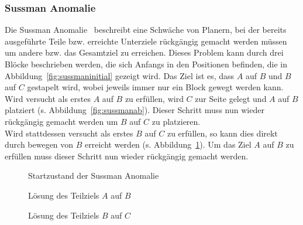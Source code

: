 \subsubsection{Sussman Anomalie}
Die Sussman Anomalie~\cite{sussman} beschreibt eine Schwäche von Planern, bei der bereits ausgeführte Teile bzw. erreichte Unterziele rückgängig gemacht werden müssen um andere bzw. das Gesamtziel zu erreichen.
Dieses Problem kann durch drei Blöcke beschrieben werden, die sich Anfangs in den Positionen befinden, die in Abbildung~\ref{fig:sussmaninitial} gezeigt wird.
Das Ziel ist es, dass $A$ auf $B$ und $B$ auf $C$ gestapelt wird, wobei jeweils immer nur ein Block gewegt werden kann.
Wird versucht als erstes $A$ auf $B$ zu erfüllen, wird $C$ zur Seite gelegt und $A$ auf $B$ platziert (s. Abbildung~\ref{fig:sussmanab}).
Dieser Schritt muss nun wieder rückgängig gemacht werden um $B$ auf $C$ zu platzieren.\\
Wird stattdessen versucht als erstes $B$ auf $C$ zu erfüllen, so kann dies direkt durch bewegen von $B$ erreicht werden (s. Abbildung~\ref{fig:sussmanbc}).
Um das Ziel $A$ auf $B$ zu erfüllen muss dieser Schritt nun wieder rückgängig gemacht werden.
\begin{figure}[!htb]
    \caption{Startzustand der Sussman Anomalie}\label{fig:sussmaninitial}
    \endminipage\hfill
    \caption{Lösung des Teilziels $A$ auf $B$}\label{fig:sussmanab}
    \endminipage\hfill
    \caption{Lösung des Teilziels $B$ auf $C$}\label{fig:sussmanbc}
    \endminipage
\end{figure}\\
